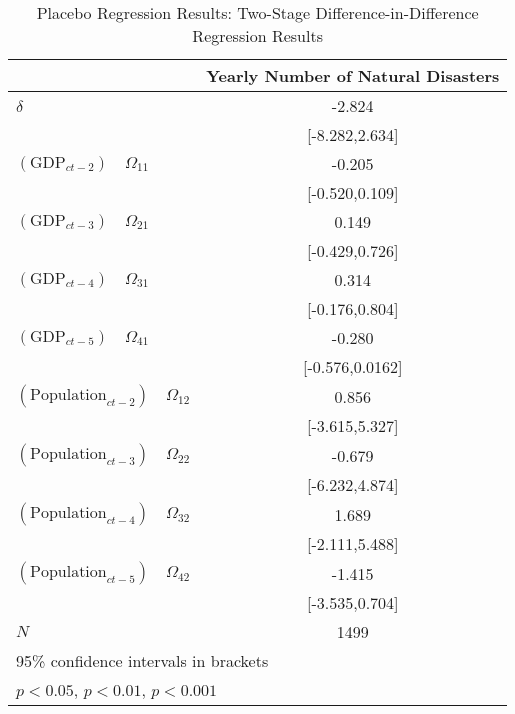 \begin{center}
    \begin{table}
    \caption{Placebo Regression Results: Two-Stage Difference-in-Difference Regression Results}
    \begin{tabular}{l*{1}{c}}
    \hline\hline
                &\multicolumn{1}{c}{Yearly Number of Natural Disasters} \\
    \hline
    $\delta$&                -2.824         \\
            &        [-8.282,2.634]         \\
    [1em]
    $(\text{GDP}_{ct-2}) \quad \Omega_{11}$&                -0.205         \\
                &        [-0.520,0.109]         \\
    [1em]
    $(\text{GDP}_{ct-3}) \quad \Omega_{21}$&                 0.149         \\
                &        [-0.429,0.726]         \\
    [1em]
    $(\text{GDP}_{ct-4}) \quad \Omega_{31}$&                 0.314         \\
                &        [-0.176,0.804]         \\
    [1em]
    $(\text{GDP}_{ct-5}) \quad \Omega_{41}$&                -0.280         \\
                &       [-0.576,0.0162]         \\
    [1em]
    $(\text{Population}_{ct-2}) \quad \Omega_{12}$&                 0.856         \\
                &        [-3.615,5.327]         \\
    [1em]
    $(\text{Population}_{ct-3}) \quad \Omega_{22}$&                -0.679         \\
                &        [-6.232,4.874]         \\
    [1em]
    $(\text{Population}_{ct-4}) \quad \Omega_{32}$&                 1.689         \\
                &        [-2.111,5.488]         \\
    [1em]
    $(\text{Population}_{ct-5}) \quad \Omega_{42}$&                -1.415         \\
                &        [-3.535,0.704]         \\
    [1em]
    \hline
    \(N\)       &                  1499         \\
    \hline\hline
    \multicolumn{2}{l}{\footnotesize 95\% confidence intervals in brackets}\\
    \multicolumn{2}{l}{\footnotesize \sym{*} \(p<0.05\), \sym{**} \(p<0.01\), \sym{***} \(p<0.001\)}\\    
    \end{tabular}
    \end{table}
    \label{tab:placebo_results}
\end{center}